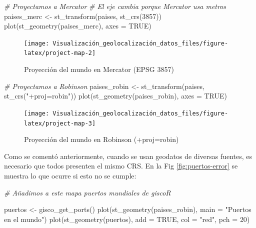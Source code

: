 \documentclass[
]{book}
\newenvironment{Shaded}{\begin{snugshade}}{\end{snugshade}}
\newcommand{\AttributeTok}[1]{\textcolor[rgb]{0.77,0.63,0.00}{#1}}
\newcommand{\CommentTok}[1]{\textcolor[rgb]{0.56,0.35,0.01}{\textit{#1}}}
\newcommand{\ConstantTok}[1]{\textcolor[rgb]{0.00,0.00,0.00}{#1}}
\newcommand{\DecValTok}[1]{\textcolor[rgb]{0.00,0.00,0.81}{#1}}
\newcommand{\FunctionTok}[1]{\textcolor[rgb]{0.00,0.00,0.00}{#1}}
\newcommand{\NormalTok}[1]{#1}
\newcommand{\OtherTok}[1]{\textcolor[rgb]{0.56,0.35,0.01}{#1}}
\newcommand{\StringTok}[1]{\textcolor[rgb]{0.31,0.60,0.02}{#1}}
\theoremstyle{definition}
\theoremstyle{definition}
\theoremstyle{definition}
\theoremstyle{definition}
\theoremstyle{remark}
\begin{document}
\begin{Shaded}
\begin{Highlighting}[]

\CommentTok{\# Proyectamos a Mercator}
\CommentTok{\# El eje cambia porque Mercator usa metros}
\NormalTok{paises\_merc }\OtherTok{\textless{}{-}} \FunctionTok{st\_transform}\NormalTok{(paises, }\FunctionTok{st\_crs}\NormalTok{(}\DecValTok{3857}\NormalTok{))}
\FunctionTok{plot}\NormalTok{(}\FunctionTok{st\_geometry}\NormalTok{(paises\_merc), }\AttributeTok{axes =} \ConstantTok{TRUE}\NormalTok{)}
\end{Highlighting}
\end{Shaded}

\begin{figure}

{\centering \texttt{[image: Visualización\_geolocalización\_datos\_files/figure-latex/project-map-2]} 

}

\caption{Proyección del mundo en Mercator (EPSG 3857)}\label{fig:project-map-2}
\end{figure}

\begin{Shaded}
\begin{Highlighting}[]
\CommentTok{\# Proyectamos a Robinson}
\NormalTok{paises\_robin }\OtherTok{\textless{}{-}} \FunctionTok{st\_transform}\NormalTok{(paises, }\FunctionTok{st\_crs}\NormalTok{(}\StringTok{"+proj=robin"}\NormalTok{))}
\FunctionTok{plot}\NormalTok{(}\FunctionTok{st\_geometry}\NormalTok{(paises\_robin), }\AttributeTok{axes =} \ConstantTok{TRUE}\NormalTok{)}
\end{Highlighting}
\end{Shaded}

\begin{figure}

{\centering \texttt{[image: Visualización\_geolocalización\_datos\_files/figure-latex/project-map-3]} 

}

\caption{Proyección del mundo en Robinson (+proj=robin)}\label{fig:project-map-3}
\end{figure}

Como se comentó anteriormente, cuando se usan geodatos de diversas fuentes, es
necesario que todos presenten el mismo CRS. En la Fig \ref{fig:puertos-error}
se muestra lo que ocurre si esto no se cumple:

\begin{Shaded}
\begin{Highlighting}[]
\CommentTok{\# Añadimos a este mapa puertos mundiales de giscoR}

\NormalTok{puertos }\OtherTok{\textless{}{-}} \FunctionTok{gisco\_get\_ports}\NormalTok{()}
\FunctionTok{plot}\NormalTok{(}\FunctionTok{st\_geometry}\NormalTok{(paises\_robin), }\AttributeTok{main =} \StringTok{"Puertos en el mundo"}\NormalTok{)}
\FunctionTok{plot}\NormalTok{(}\FunctionTok{st\_geometry}\NormalTok{(puertos), }\AttributeTok{add =} \ConstantTok{TRUE}\NormalTok{, }\AttributeTok{col =} \StringTok{"red"}\NormalTok{, }\AttributeTok{pch =} \DecValTok{20}\NormalTok{)}
\end{Highlighting}
\end{Shaded}
\end{document}
